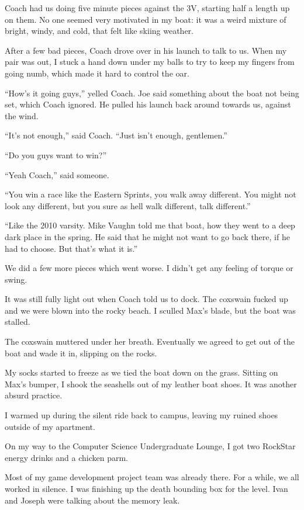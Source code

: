 Coach had us doing five minute pieces against the 3V, starting half a
length up on them.  No one seemed very motivated in my boat: it was a weird
mixture of bright, windy, and cold, that felt like skiing weather.

After a few bad pieces, Coach drove over in his launch to talk to us.  When my
pair was out, I stuck a hand down under my balls to try to keep my fingers from
going numb, which made it hard to control the oar.

``How's it going guys,'' yelled Coach.  Joe said something about the boat not
being set, which Coach ignored.  He pulled his launch back around towards us,
against the wind.


``It's not enough,'' said Coach.  ``Just isn't enough, gentlemen.''

``Do you guys want to win?''

``Yeah Coach,'' said someone.

``You win a race like the Eastern Sprints, you walk away different.  You might
not look any different, but you sure as hell walk different, talk different.''

``Like the 2010 varsity.  Mike Vaughn told me that boat, how they went to a deep
dark place in the spring.  He said that he might not want to go back there, if
he had to choose.  But that's what it is.''

We did a few more pieces which went worse.  I didn't get any feeling of torque
or swing.  

It was still fully light out when Coach told us to dock.  The coxswain fucked up
and we were blown into the rocky beach.  I sculled Max's blade, but the
boat was stalled.

The coxswain muttered under her breath.  Eventually we agreed to get out of the
boat and wade it in, slipping on the rocks.

My socks started to freeze as we tied the boat down on the grass.  Sitting on
Max's bumper, I shook the seashells out of my leather boat shoes.  It was
another absurd practice.  

I warmed up during the silent ride back to campus, leaving my ruined shoes
outside of my apartment.  

On my way to the Computer Science Undergraduate Lounge, I got two RockStar
energy drinks and a chicken parm.

Most of my game development project team was already there.  For a while, we all
worked in silence.  I was finishing up the death bounding box for the level.
Ivan and Joseph were talking about the memory leak.

